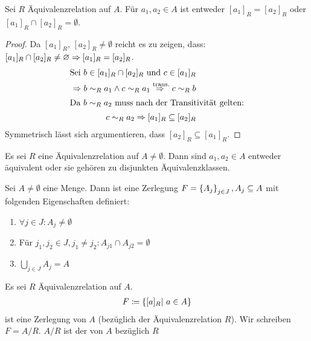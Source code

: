 \begin{lemma}
    Sei $R$ Äquivalenzrelation auf $A$. Für $a_1,a_2\in A$ ist entweder $[a_1]_R = [a_2]_R$ oder $[a_1]_R \cap [a_2]_R = \emptyset$.
    \begin{proof}
        Da $[a_1]_R$, $[a_2]_R \neq \emptyset$ reicht es zu zeigen, dass: $[a_1]_R \cap [a_2]_R \neq \varnothing \Rightarrow{} [a_1]_R = [a_2]_R$.
        \begin{align*}
            \text{Sei }b\in [a_1]_R\cap [a_2]_R\text{ und }c\in [a_1]_R\\
            \Rightarrow{} b\sim_R a_1 \land c\sim_R a_1 \overset{\text{trans.}}{\Rightarrow{}} c\sim_R b\\
            \intertext{Da  $b\sim_R a_2$ muss nach der Transitivität gelten:}
            c\sim_R a_2 \Rightarrow{} [a_1]_R \subseteq [a_2]_R
        \end{align*}
        Symmetrisch lässt sich argumentieren, dass $[a_2]_R \subseteq [a_1]_R$.
    \end{proof}
\end{lemma}

\begin{korollar}
    Es sei $R$ eine Äquivalenzrelation auf $A\neq \emptyset$. Dann sind $a_1,a_2\in A$ entweder äquivalent oder sie gehören zu disjunkten Äquivalenzklassen.
\end{korollar}

\begin{definition}
    Sei $A\neq \emptyset$ eine Menge. Dann ist eine Zerlegung $F = \left\{A_j\right\}_{j\in J}, A_j\subseteq A$ mit folgenden Eigenschaften definiert:
    \begin{enumerate}
        \item $\forall j\in J\colon A_j\neq \emptyset$
        \item Für $j_1, j_2\in J, j_1\neq j_2\colon A_{j1} \cap A_{j2} = \emptyset$
        \item $\bigcup_{j\in J}A_j = A$
    \end{enumerate}
\end{definition}

\begin{notation}[Quotient]
    Es sei $R$ Äquivalenzrelation auf $A$.
    \begin{align*}
        F\coloneqq\left\{[a]_R|~a\in A\right\}
    \end{align*}
    ist eine Zerlegung von $A$ (bezüglich der Äquivalenzrelation $R$). Wir schreiben $F = A/R$.
    $A/R$ ist der  von $A$ bezüglich $R$
\end{notation}

